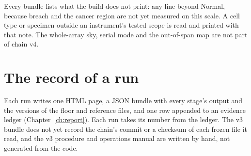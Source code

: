 Every bundle lists what the build does not print: any line beyond Normal, because breach and the cancer region are not yet measured on this scale. A cell type or specimen outside an instrument's tested scope is read and printed with that note. The whole-array sky, serial mode and the out-of-span map are not part of chain v4. \openprob

\section{The record of a run}

Each run writes one HTML page, a JSON bundle with every stage's output and the versions of the floor and reference files, and one row appended to an evidence
ledger (Chapter~\ref{ch:report}). Each run takes its number from the ledger. The v3 bundle does not yet record the chain's commit or a checksum of each
frozen file it read, and the v3 procedure and operations manual are written by hand, not generated from the code. \openprob
